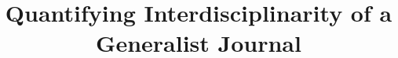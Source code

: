 %
%
%
%
%
%
\RequirePackage{fix-cm}
%
\documentclass[smallextended]{svjour3}       %
%
\smartqed  %
%
\usepackage{graphicx}
%
%
%
%
%




\usepackage{natbib}








\title{Quantifying Interdisciplinarity of a Generalist Journal
}

